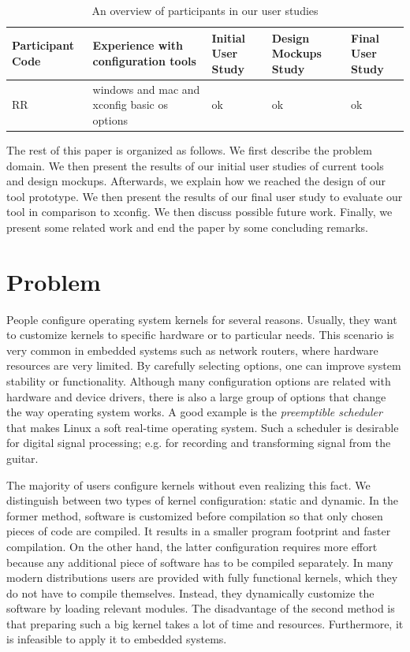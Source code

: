 \documentclass{chi2009}
\begin{document}
\begin{table}[!t]
\centering
\begin{tabular*}{\textwidth}{Q{1.5cm} Q{5.5cm} Q{2.5cm} Q{4cm} Q{2.5cm}}
\toprule
Participant Code & Experience with configuration tools & Initial User Study & Design Mockups Study & Final User Study \\
\midrule
RR & windows and mac and xconfig \linebreak basic os options & ok & ok & ok \\
\bottomrule
\end{tabular*}
\caption{An overview of participants in our user studies}
\label{tab:overviewpart}
\end{table}

The rest of this paper is organized as follows. We first describe the problem domain. We then present the results of our initial user studies of current tools
and design mockups. Afterwards, we explain how we reached the design of our tool prototype. We then present the results of our final user study to evaluate our
tool in comparison to \textsf{xconfig}. We then discuss possible future work. Finally, we present some related work and end the paper by some concluding
remarks.

\section{Problem}\label{sec:problem}

People configure operating system kernels for several reasons. Usually, they want to customize kernels to specific hardware or to particular needs. This
scenario is very common in embedded systems such as network routers, where hardware resources are very limited. By carefully selecting options, one can improve
system stability or functionality. Although many configuration options are related with hardware and device drivers, there is also a large group of options that
change the way operating system works. A good example is the \textit{preemptible scheduler} that makes Linux a soft real-time operating system. Such a scheduler
is desirable for digital signal processing; e.g. for recording and transforming signal from the guitar.

The majority of users configure kernels without even realizing this fact. We distinguish between two types of kernel configuration: static and dynamic. In the
former method, software is customized before compilation so that only chosen pieces of code are compiled. It results in a smaller program footprint and faster
compilation. On the other hand, the latter configuration requires more effort because any additional piece of software has to be compiled separately. In many
modern distributions users are provided with fully functional kernels, which they do not have to compile themselves. Instead, they dynamically customize the
software by loading relevant modules. The disadvantage of the second method is that preparing such a big kernel takes a lot of time and resources. Furthermore,
it is infeasible to apply it to embedded systems.
\end{document}
